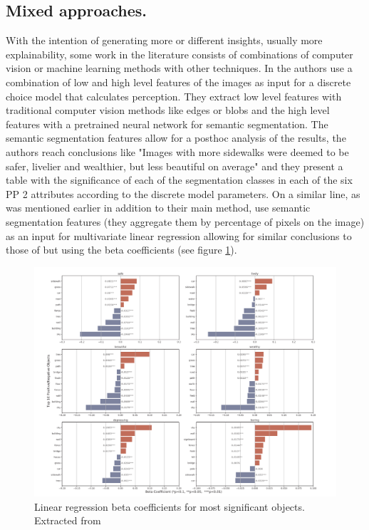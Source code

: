 \subsection{Mixed approaches.}
\label{section:mixed}

With the intention of generating more or different insights, usually more explainability, some
work in the literature consists of combinations of computer vision or machine learning methods
with other techniques. In  the authors use a combination of low and high level features
of the images as input for a discrete choice model that calculates perception. They extract low level features
with traditional computer vision methods like edges or blobs and the high level features with a pretrained
neural network for semantic segmentation. The semantic segmentation features allow for a posthoc analysis of
the results, the authors reach conclusions like "Images with more sidewalks were deemed to be
safer, livelier and wealthier, but less beautiful on average" and they present a table with the significance
of each of the segmentation classes in each of the six PP 2 attributes according to the discrete model parameters.
On a similar line, as was mentioned earlier  in addition to their main method, use
semantic segmentation features (they aggregate them by percentage of pixels on the image)
as an input for multivariate linear regression allowing for similar conclusions to those of 
but using the beta coefficients (see figure \ref{fig:beta}).

\begin{figure}[ht]
	\begin{center}
	\includegraphics[width=1\textwidth]{./figures/zhang.png}
	\caption[Beta Coefficients]{ Linear regression beta coefficients for most significant objects. Extracted from  }
	\label{fig:beta}
	\end{center}
\end{figure}

